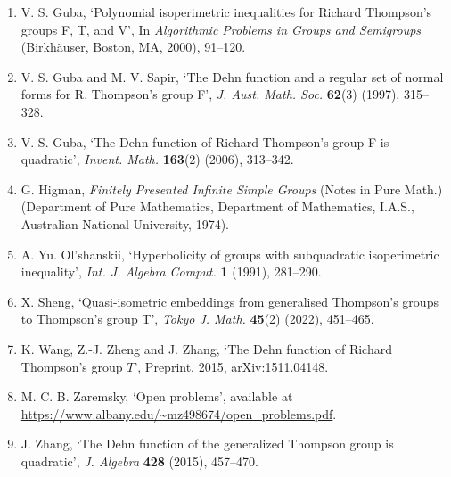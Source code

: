 \begin{enumerate}
\item V. S. Guba, `Polynomial isoperimetric inequalities for Richard Thompson's groups F, T, and V', In \emph{Algorithmic Problems in Groups and Semigroups} (Birkh\"auser, Boston, MA, 2000), 91--120.
\item V. S. Guba and M. V. Sapir, `The Dehn function and a regular set of normal forms for R. Thompson's group F', \emph{J. Aust. Math. Soc.} \textbf{62}(3) (1997), 315--328.
\item V. S. Guba, `The Dehn function of Richard Thompson's group F is quadratic', \emph{Invent. Math.} \textbf{163}(2) (2006), 313--342.
\item G. Higman, \emph{Finitely Presented Infinite Simple Groups} (Notes in Pure Math.) (Department of Pure Mathematics, Department of Mathematics, I.A.S., Australian National University, 1974).
\item A. Yu. Ol'shanskii, `Hyperbolicity of groups with subquadratic isoperimetric inequality', \emph{Int. J. Algebra Comput.} \textbf{1} (1991), 281--290.
\item X. Sheng, `Quasi-isometric embeddings from generalised Thompson's groups to Thompson's group T', \emph{Tokyo J. Math.} \textbf{45}(2) (2022), 451--465.
\item K. Wang, Z.-J. Zheng and J. Zhang, `The Dehn function of Richard Thompson's group $T$', Preprint, 2015, arXiv:1511.04148.
\item M. C. B. Zaremsky, `Open problems', available at\newline
\url{https://www.albany.edu/~mz498674/open_problems.pdf}.
\item J. Zhang, `The Dehn function of the generalized Thompson group is quadratic', \emph{J. Algebra} \textbf{428} (2015), 457--470.
\end{enumerate}
